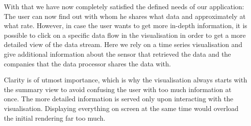 \documentclass[../paper.tex]{subfiles}
\begin{document}
  With that we have now completely satisfied the defined needs of our application:
  The user can now find out with whom he shares what data and approximately at what
  rate. However, in case the user wants to get more in-depth information, it is
  possible to click on a specific data flow in the visualisation in order
  to get a more detailed view of the data stream. Here we rely on a time series
  visualisation and give additional information about the sensor that retrieved
  the data and the companies that the data processor shares the data with.

  Clarity is of utmost importance, which is why the visualisation always starts
  with the summary view to avoid confusing the user with too much information
  at once. The more detailed information is served only upon interacting with
  the visualisation. Displaying everything on screen at the same time would
  overload the initial rendering far too much.
\end{document}
